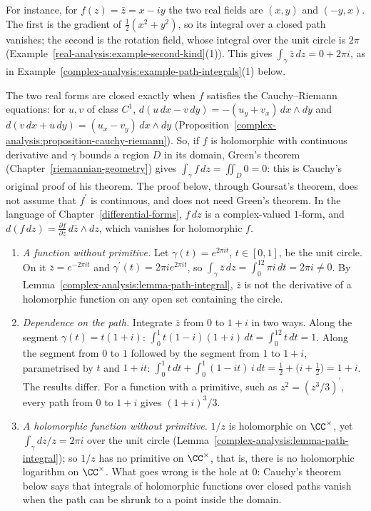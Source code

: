 For instance, for $f(z) = \bar z = x - iy$ the two real fields are $(x, y)$ and $(-y, x)$. The first is the gradient of $\frac12(x^2 + y^2)$, so its integral over a closed path vanishes; the second is the rotation field,
whose integral over the unit circle is $2\pi$ (Example~\ref{real-analysis:example-second-kind}(1)). This gives $\int_\gamma\bar z\,dz = 0 + 2\pi i$, as in Example~\ref{complex-analysis:example-path-integrals}(1) below.

\begin{remark}\label{complex-analysis:remark-cauchy-green}
The two real forms are closed exactly when $f$ satisfies the Cauchy--Riemann equations: for $u, v$ of class $C^1$, $d(u\,dx - v\,dy) = -(u_y + v_x)\,dx \wedge dy$ and $d(v\,dx + u\,dy) = (u_x - v_y)\,dx \wedge dy$
(Proposition~\ref{complex-analysis:proposition-cauchy-riemann}). So, if $f$ is holomorphic with continuous derivative and $\gamma$ bounds a region $D$ in its domain, Green's theorem (Chapter~\ref{riemannian-geometry})
gives $\int_\gamma f\,dz = \iint_D0 = 0$: this is Cauchy's original proof of his theorem. The proof below, through Goursat's theorem, does not assume that $f^{\prime}$ is continuous, and does not need Green's
theorem. In the language of Chapter~\ref{differential-forms}, $f\,dz$ is a complex-valued $1$-form, and $d(f\,dz) = \frac{\partial f}{\partial\bar z}\,d\bar z \wedge dz$, which vanishes for holomorphic $f$.
\end{remark}

\begin{example}\label{complex-analysis:example-path-integrals}
\begin{enumerate}
\item \emph{A function without primitive.} Let $\gamma(t) = e^{2\pi it}$, $t \in [0, 1]$, be the unit circle. On it $\bar z = e^{-2\pi it}$ and $\gamma^{\prime}(t) = 2\pi ie^{2\pi it}$, so
$\int_\gamma\bar z\,dz = \int_0^12\pi i\,dt = 2\pi i \neq 0$. By Lemma~\ref{complex-analysis:lemma-path-integral}, $\bar z$ is not the derivative of a holomorphic function on any open set containing the
circle.
\item \emph{Dependence on the path.} Integrate $\bar z$ from $0$ to $1 + i$ in two ways. Along the segment $\gamma(t) = t(1 + i)$: $\int_0^1t(1 - i)(1 + i)\,dt = \int_0^12t\,dt = 1$. Along the segment from
$0$ to $1$ followed by the segment from $1$ to $1 + i$, parametrised by $t$ and $1 + it$: $\int_0^1t\,dt + \int_0^1(1 - it)\,i\,dt = \frac12 + \bigl(i + \frac12\bigr) = 1 + i$. The results differ. For a
function with a primitive, such as $z^2 = (z^3/3)^{\prime}$, every path from $0$ to $1 + i$ gives $(1 + i)^3/3$.
\item \emph{A holomorphic function without primitive.} $1/z$ is holomorphic on $\CC^\times$, yet $\int_\gamma dz/z = 2\pi i$ over the unit circle (Lemma~\ref{complex-analysis:lemma-path-integral}); so $1/z$ has no
primitive on $\CC^\times$, that is, there is no holomorphic logarithm on $\CC^\times$. What goes wrong is the hole at $0$: Cauchy's theorem below says that integrals of holomorphic functions over closed
paths vanish when the path can be shrunk to a point inside the domain.
\end{enumerate}
\end{example}

